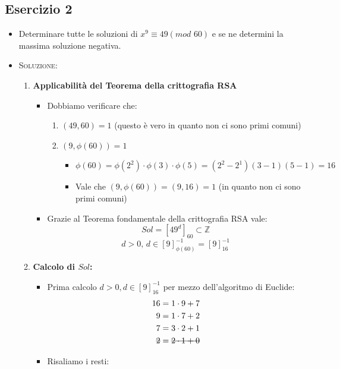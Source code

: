 \documentclass[10pt]{article}
\begin{document}
	\subsection{Esercizio 2}
		\begin{itemize}
		\item
		Determinare tutte le soluzioni di $x^9 \equiv 49(mod \,\, 60)$ e se ne determini la massima soluzione negativa.
		\item
		\textsc{Soluzione:}
		\begin{enumerate}
		\item
		\textbf{Applicabilità del Teorema della crittografia RSA}
		\begin{itemize}
		\item
		Dobbiamo verificare che:
		\begin{enumerate}
		\item
		$(49,60)=1$ {\small (questo è vero in quanto non ci sono primi comuni)}
		\item
		$(9,\phi(60)) = 1$
		\begin{itemize}
		\item
		$\phi(60) = \phi(2^2) \cdot \phi(3) \cdot \phi(5) = (2^2 - 2^1)(3-1)(5-1) = 16$
		\item
		Vale che $(9,\phi(60)) = (9,16) = 1$ {\small (in quanto non ci sono primi comuni)}
		\end{itemize}
		\end{enumerate}
		\item
		Grazie al Teorema fondamentale della crittografia RSA vale:
			$$Sol = \left[49^d\right]_{60} \subset \mathbb{Z}$$
			$$d>0,\, d \in \left[9\right]_{\phi(60)}^{-1} = \left[9\right]_{16}^{-1}$$
		\end{itemize}
		\item
		\textbf{Calcolo di $Sol$:}
		\begin{itemize}
		\item
		Prima calcolo $d>0, d \in \left[9\right]_{16}^{-1}$ per mezzo dell'algoritmo di Euclide:
		\begin{equation}
		\begin{split}
		16 &= 1 \cdot 9 + 7 \\
		9 &= 1 \cdot 7 + 2 \\
		7 &= 3 \cdot 2 + 1 \\	
		\hbox{\sout{$2$}} &= \hbox{\sout{$2 \cdot 1 + 0$}}
		\notag
		\end{split}
		\end{equation}
		\item
		Risaliamo i resti:
		\begin{equation}

\end{equation}
\end{itemize}
\end{enumerate}
\end{itemize}
\end{document}
